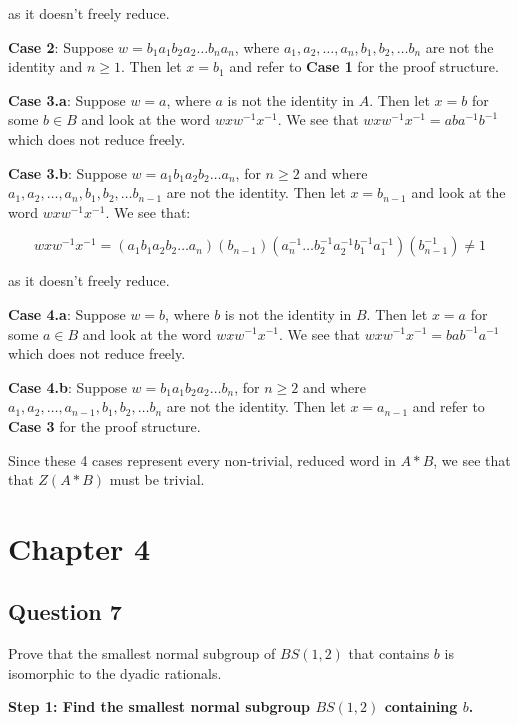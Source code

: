 \documentclass[12pt]{article}%
\begin{document}
as it doesn't freely reduce.

\textbf{Case 2}: Suppose $w=b_{1}a_{1}b_{2}a_{2}\ldots b_{n}a_{n}$, where
$a_1,a_2,\ldots ,a_n, b_1,b_2,\ldots b_n$ are not the identity and $n\geq 1$. Then let $x=b_1$ and refer
to \textbf{Case 1} for the proof structure. 

\textbf{Case 3.a}:
Suppose $w=a$, where $a$ is not the identity in $A$. Then let $x=b$ for some $b\in B$ and look at the word
$wxw^{-1}x^{-1}$. We see that $wxw^{-1}x^{-1}=aba^{-1}b^{-1}$ which does not reduce freely.

\textbf{Case 3.b}: 
Suppose $w=a_{1}b_{1}a_{2}b_{2}\ldots a_{n}$, for $n\geq 2$ and where $a_1,a_2,\ldots ,a_n, b_1,b_2,\ldots b_{n-1}$ are not the identity. Then let $x=b_{n-1}$ and look at the word $wxw^{-1}x^{-1}$. We see that:

\begin{dmath}
wxw^{-1}x^{-1}= (a_{1}b_{1}a_{2}b_{2}\ldots a_{n}) (b_{n-1}) (a_{n}^{-1}\ldots b_{2}^{-1}a_{2}^{-1}b_{1}^{-1}a_{1}^{-1}) (b_{n-1}^{-1}) \neq 1
\end{dmath}

as it doesn't freely reduce.

\textbf{Case 4.a}:
Suppose $w=b$, where $b$ is not the identity in $B$. Then let $x=a$ for some $a\in B$ and look at the word
$wxw^{-1}x^{-1}$. We see that $wxw^{-1}x^{-1}=bab^{-1}a^{-1}$ which does not reduce freely.

\textbf{Case 4.b}: Suppose $w=b_{1}a_{1}b_{2}a_{2}\ldots b_{n}$, for $n\geq 2$ and where
$a_1,a_2,\ldots ,a_{n-1}, b_1,b_2,\ldots b_n$ are not the identity. Then let $x=a_{n-1}$ and refer to
\textbf{Case 3} for the proof structure. 

Since these 4 cases represent every non-trivial, reduced word in $A*B$, we see that that $Z(A*B)$ must
be trivial.

\section*{Chapter 4}

\subsection*{Question 7}

Prove that the smallest normal subgroup of $BS(1, 2)$ that contains $b$ is isomorphic to the dyadic
rationals.

\textbf{Step 1: Find the smallest normal subgroup $BS(1,2)$ containing $b$.}
\end{document}
